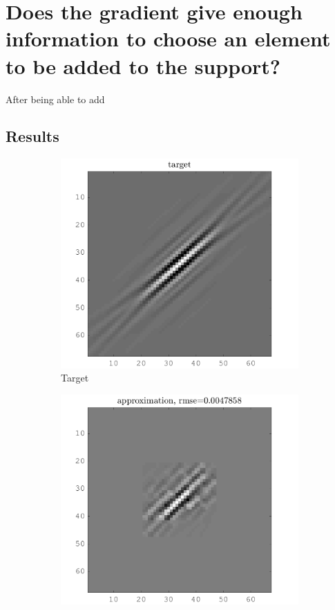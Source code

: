 \section{Does the gradient give enough information to choose an element to be added to the support?}

After being able to add
\subsection{Results}
\begin{figure}[!h]\centering
\begin{subfigure}[b]{0.49\textwidth}\centering
\includegraphics[width=\textwidth]{figures/xp/xp_128x128_sc2_angl1_K3_S3_node4_target.png}
\caption{Target}
\end{subfigure}
\begin{subfigure}[b]{0.49\textwidth}\centering
\includegraphics[width=\textwidth]{figures/xp/xp_128x128_sc2_angl1_K3_S3_node4_approx.png}

\end{subfigure}
\end{figure}

